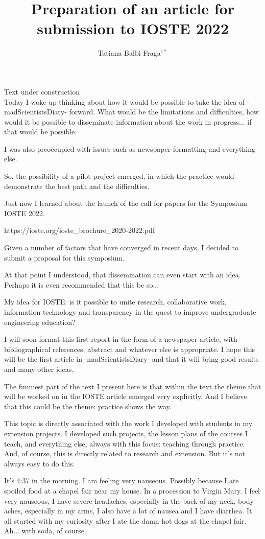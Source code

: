 \documentclass{book}
\title{Preparation of an article for submission to IOSTE 2022}
\author{Tatiana Balbi Fraga$^{1*}$}
\begin{document}
Text under construction \\

Today I woke up thinking about how it would be possible to take the idea of -madScientistsDiary- forward. What would be the limitations and difficulties, how would it be possible to disseminate information about the work in progress... if that would be possible.

I was also preoccupied with issues such as newspaper formatting and everything else.

So, the possibility of a pilot project emerged, in which the practice would demonstrate the best path and the difficulties.

Just now I learned about the launch of the call for papers for the Symposium IOSTE 2022.

https://ioste.org/ioste\_brochure\_2020-2022.pdf

Given a number of factors that have converged in recent days, I decided to submit a proposal for this symposium.

At that point I understood, that dissemination can even start with an idea. Perhaps it is even recommended that this be so...

My idea for IOSTE: is it possible to unite research, collaborative work, information technology and transparency in the quest to improve undergraduate engineering education?

I will soon format this first report in the form of a newspaper article, with bibliographical references, abstract and whatever else is appropriate. I hope this will be the first article in -madScientistsDiary- and that it will bring good results and many other ideas.

The funniest part of the text I present here is that within the text the theme that will be worked on in the IOSTE article emerged very explicitly. And I believe that this could be the theme: practice shows the way.

This topic is directly associated with the work I developed with students in my extension projects. I developed such projects, the lesson plans of the courses I teach, and everything else, always with this focus: teaching through practice. And, of course, this is directly related to research and extension. But it's not always easy to do this.

It's 4:37 in the morning. I am feeling very nauseous. Possibly because I ate spoiled food at a chapel fair near my house. In a procession to Virgin Mary. I feel very nauseous, I have severe headaches, especially in the back of my neck, body aches, especially in my arms, I also have a lot of nausea and I have diarrhea. It all started with my curiosity after I ate the damn hot dogs at the chapel fair. Ah... with soda, of course.
\end{document}
